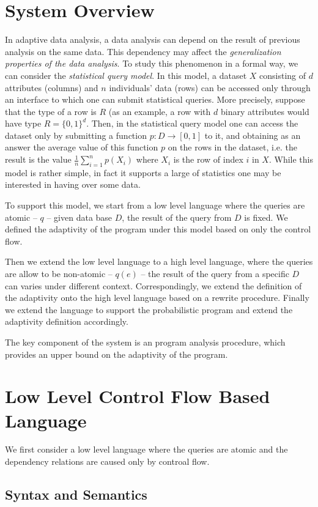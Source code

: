 \documentclass[a4paper,11pt]{article}
\begin{document}
\section{System Overview}
In adaptive data analysis, a data analysis can depend on the result of
previous analysis on the same data. This dependency may affect the
\emph{generalization properties of the data analysis}. To study this phenomenon
in a formal way, we can consider the \emph{statistical query
  model}. In this model, a dataset $X$ consisting of $d$ attributes (columns) and $n$
individuals' data (rows) can be accessed only through an interface to
which one can submit statistical queries. More precisely, suppose that
the type of a row is $R$ (as an example, a row with $d$ binary
attributes would have type $R=\{0,1\}^d$. Then, in the statistical
query model one can access the dataset only by submitting a function
$p:D\to [0,1] $ to it, and obtaining as an answer the average value of
this function $p$ on the rows in the dataset, i.e. the result is the
value $\frac{1}{n}\sum_{i=1}^n p(X_i)$ where
$X_i$ is the row of index $i$ in $X$. While this model is rather
simple, in fact it supports a large of statistics one may be
interested in having over some data.

To support this model, we start from a low level language where the queries are atomic -- $q$ -- given data base $D$, the result of the query from $D$ is fixed.
We defined the adaptivity of the program under this model based on only the control flow.

Then we extend the low level language to a high level language,
where the queries are allow to be non-atomic -- $q(e)$ -- the result of the query from a specific $D$ can varies under different context.
Correspondingly, we extend the definition of the adaptivity onto the high level language based on a rewrite procedure.
Finally we extend the language to support the probabilistic program and extend the adaptivity definition accordingly.

The key component of the system is an program analysis procedure, which provides an upper bound on the adaptivity of the program.

\section{Low Level Control Flow Based Language}
We first consider a low level language where the queries are atomic
and the dependency relations are caused only by controal flow.
%
\subsection{Syntax and Semantics}
%
\end{document}
